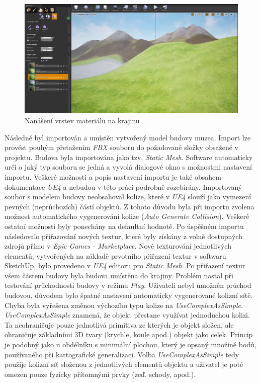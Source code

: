 \documentclass[a4paper, 12pt]{report}
\begin{document}
\begin{figure}[h!]
	\centering
	\includegraphics[width=16cm]{Landscape_Paint.jpg}
	\caption{Nanášení vrstev materiálu na krajinu}
\end{figure}

Následně byl importován a umístěn vytvořený model budovy muzea. Import lze provést pouhým přetažením \textit{FBX} souboru do požadované složky obsažené v projektu. Budova byla importována jako tzv. \textit{Static Mesh}. Software automaticky určí o jaký typ souboru se jedná a vyvolá dialogové okno s možnostmi nastavení importu. Veškeré možnosti a popis nastavení importu je také obsahem dokumentace \textit{UE4} a nebudou v této práci podrobně rozebírány. Importovaný soubor s modelem budovy neobsahoval kolize, které v \textit{UE4} slouží jako vymezení pevných (neprůchozích) částí objektů. Z tohoto důvodu byla při importu zvolena možnost automatického vygenerování kolize (\textit{Auto Generate Collision}). Veškeré ostatní možnosti byly ponechány na defaultní hodnotě. Po úspěšném importu následovalo přiřazování nových textur, které byly získány z volně dostupných zdrojů přímo v \textit{Epic Games - Marketplace}. Nové texturování jednotlivých elementů, vytvořených na základě prvotního přiřazení textur v softwaru SketchUp, bylo provedeno v \textit{UE4} editoru pro \textit{Static Mesh}. Po přiřazení textur všem částem budovy byla budova umístěna do krajiny. Problém nastal při testování průchodnosti budovy v režimu \textit{Play}. Uživateli nebyl umožněn průchod budovou, důvodem bylo špatné nastavení automaticky vygenerované kolizní sítě. Chyba byla vyřešena změnou výchozího typu kolize na \textit{UseComplexAsSimple}.\textit{ UseComplexAsSimple} znamená, že objekt přestane využívat jednoduchou kolizi. Ta neohraničuje pouze jednotlivá primitiva ze kterých je objekt složen, ale ohraničuje základními 3D tvary (krychle, koule apod.) objekt jako celek. Princip je podobný jako u obdélníku s minimální plochou, který je opsaný množině bodů, používaného při kartografické generalizaci. Volba \textit{UseComplexAsSimple} tedy použije kolizní síť složenou z jednotlivých elementů objektu a uživatel je poté omezen pouze fyzicky přítomnými prvky (zeď, schody, apod.).
\end{document}
